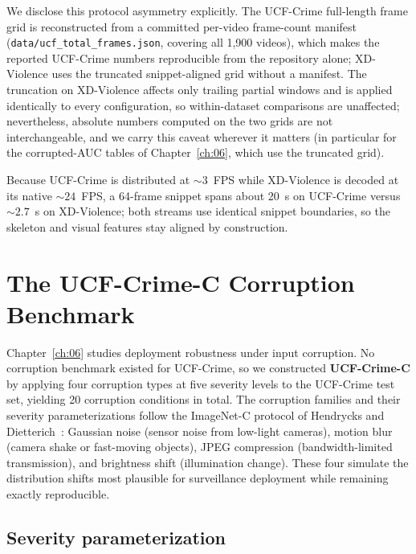 We disclose this protocol asymmetry explicitly. The UCF-Crime full-length
frame grid is reconstructed from a committed per-video frame-count manifest
(\texttt{data/\allowbreak ucf\_total\_frames.json}, covering all 1,900 videos), which
makes the reported UCF-Crime numbers reproducible from the repository alone;
XD-Violence uses the truncated snippet-aligned grid without a manifest. The
truncation on XD-Violence affects only trailing partial windows and is applied
identically to every configuration, so within-dataset comparisons are
unaffected; nevertheless, absolute numbers computed on the two grids are not
interchangeable, and we carry this caveat wherever it matters (in particular
for the corrupted-AUC tables of Chapter~\ref{ch:06}, which use the truncated
grid).

Because UCF-Crime is distributed at ${\sim}3$~FPS while XD-Violence is decoded
at its native ${\sim}24$~FPS, a 64-frame snippet spans about 20~s on UCF-Crime
versus ${\sim}2.7$~s on XD-Violence; both streams use identical snippet
boundaries, so the skeleton and visual features stay aligned by construction.

\section{The UCF-Crime-C Corruption Benchmark}
\label{sec:ucfcrimec}

Chapter~\ref{ch:06} studies deployment robustness under input corruption. No
corruption benchmark existed for UCF-Crime, so we constructed
\textbf{UCF-Crime-C} by applying four corruption types at five severity levels
to the UCF-Crime test set, yielding 20 corruption conditions in total. The
corruption families and their severity parameterizations follow the ImageNet-C
protocol of Hendrycks and Dietterich~\cite{hendrycks2019imagenetc}: Gaussian
noise (sensor noise from low-light cameras), motion blur (camera shake or
fast-moving objects), JPEG compression (bandwidth-limited transmission), and
brightness shift (illumination change). These four simulate the distribution
shifts most plausible for surveillance deployment while remaining exactly
reproducible.

\subsection{Severity parameterization}

